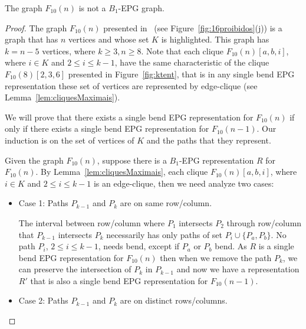 




\begin{lema}\label{lem:f10}
The graph $F_{10}(n)$ is not a $B_1$-EPG graph. 
\end{lema}

\begin{proof}
The graph $F_{10}(n)$ presented in~\cite{alcon2015characterizing} (see Figure~\ref{fig:16proibidos}(j)) is a graph that has $n$ vertices and whose set $K$ is highlighted. This graph has $k=n-5$ vertices, where $k\geq 3, n\geq 8$. Note that each clique $F_{10}(n)[a, b, i]$, where $i \in K$ and  $2\leq i \leq k-1$, have the same  characteristic of the clique $F_{10}(8)[2, 3, 6]$  presented in Figure~\ref{fig:ktent}, that is in any single bend EPG representation these set of vertices are represented by edge-clique (see Lemma~\ref{lem:cliquesMaximais}).

We will prove that there exists a single bend  EPG representation for $F_{10}(n)$ if only if there exists a single bend  EPG representation for $F_{10}(n-1)$. Our induction  is on the set of vertices of $K$ and the paths that they represent.

%

Given the graph $F_{10}(n)$, suppose there is a $B_1$-EPG representation $R$ for $F_{10}(n)$. By Lemma~\ref{lem:cliquesMaximais}, each clique $F_{10}(n)[a, b, i]$, where $i \in K$ and  $2\leq i \leq k-1$ is an edge-clique, then we need analyze two cases:

\begin{itemize}
    \item Case 1: Paths $\displaystyle P_{{k-1}}$ and $\displaystyle P_{{k}}$ are on same row/column.
    
    The interval between row/column where $ P_{{1}}$ intersects $ P_{{2}}$ through row/column that $ P_{{k-1}}$ intersects $ P_{{k}}$  necessarily has only paths of set $P_i \cup \{P_a,P_b\}$. No path $P_i$, $2 \leq i \leq k-1$, needs bend, except if $P_a$ or $P_b$ bend.
     As $R$ is a single bend EPG representation for $F_{10}(n)$ then when we remove the path $\displaystyle P_{{k}}$, we can preserve the intersection of $P_{{k}}$ in $P_{{k-1}}$ and now we have a representation $R'$ that is also a  single bend EPG representation for $F_{10}(n-1)$.
    
      \item Case 2: Paths $\displaystyle P_{{k-1}}$ and $\displaystyle P_{{k}}$ are on distinct rows/columns.
      

\end{itemize}
\end{proof}
